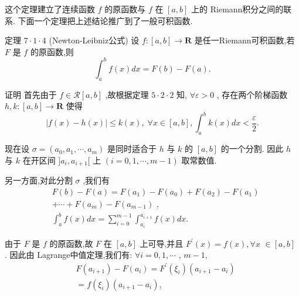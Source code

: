 这个定理建立了连续函数 $f$ 的原函数与 $f$ 在 $\left\lbrack  {a,b}\right\rbrack$ 上的 Riemann积分之间的联系. 下面一个定理把上述结论推广到了一般可积函数.

定理 $7 \cdot  1 \cdot  4$ (Newton-Leibniz公式) 设 $f : \left\lbrack  {a,b}\right\rbrack   \rightarrow  \mathbf{R}$ 是任一Riemann可积函数,若 $F$ 是 $f$ 的原函数,则
$${\int }_{a}^{b}f\left( x\right) {dx} = F\left( b\right)  - F\left( a\right) .$$

证明 首先由于 $f \in  \mathcal{R}\left\lbrack  {a,b}\right\rbrack$ ,故根据定理 $5 \cdot  2 \cdot  2$ 知, $\forall \varepsilon  > 0$ , 存在两个阶梯函数 $h,k : \left\lbrack  {a,b}\right\rbrack   \rightarrow  \mathbf{R}$ 使得
$$\left| {f\left( x\right)  - h\left( x\right) }\right|  \leq  k\left( x\right) ,\;\forall x \in  \left\lbrack  {a,b}\right\rbrack  ,{\int }_{a}^{b}k\left( x\right) {dx} < \frac{\varepsilon }{2}.$$

现在设 $\sigma  = \left( {{a}_{0},{a}_{1},\cdots ,{a}_{m}}\right)$ 是同时适合于 $h$ 与 $k$ 的 $\left\lbrack  {a,b}\right\rbrack$ 的一个分割. 因此 $h$ 与 $k$ 在开区间 $\rbrack {a}_{i},{a}_{i + 1}\lbrack$ 上 $\left( {i = 0,1,\cdots ,m - 1}\right)$ 取常数值.

另一方面,对此分割 $\sigma$ ,我们有
\begin{align*}
	&F\left( b\right)  - F\left( a\right)  = F\left( {a}_{1}\right)  - F\left( {a}_{0}\right)  + F\left( {a}_{2}\right)  - F\left( {a}_{1}\right)\\
	&+ \cdots  + F\left( {a}_{m}\right)  - F\left( {a}_{m - 1}\right) \text{ , }\\
	&{\int }_{a}^{b}f\left( x\right) {dx} = \mathop{\sum }\limits_{{i = 0}}^{{m - 1}}{\int }_{{a}_{i}}^{{a}_{i + 1}}f\left( x\right) {dx}.
\end{align*}

由于 $F$ 是 $f$ 的原函数,故 $F$ 在 $\left\lbrack  {a,b}\right\rbrack$ 上可导,并且 ${F}^{\prime }\left( x\right)  = f\left( x\right) ,\forall x$  $\in  \left\lbrack  {a,b}\right\rbrack$ . 因此由 Lagrange中值定理,我们有: $\forall i = 0,1,\cdots$ , $m - 1,$
\begin{align*}
	&F\left( {a}_{i + 1}\right)  - F\left( {a}_{i}\right)  = {F}^{\prime }\left( {\xi }_{i}\right) \left( {{a}_{i + 1} - {a}_{i}}\right)\\
	&= f\left( {\xi }_{i}\right) \left( {{a}_{i + 1} - {a}_{i}}\right) ,
\end{align*}

